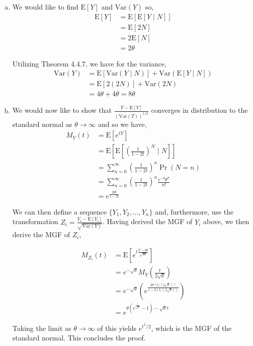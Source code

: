 \documentclass[11pt]{article}
\begin{document}
\begin{enumerate}[(a)]
  \item We would like to find $\mathrm{E}[Y]$ and $\mathrm{Var}(Y)$
    so,
    \begin{align*}
      \mathrm{E}[Y] &= \mathrm{E}[\mathrm{E}[Y \mid N]] \\
      &= \mathrm{E}[2N] \\
      &= 2 \mathrm{E}[N] \\
      &= 2 \theta
    \end{align*}

    Utilizing Theorem 4.4.7, we have for the variance,
    \begin{align*}
      \mathrm{Var}(Y) &= \mathrm{E}[\mathrm{Var}(Y \mid N)] +
                        \mathrm{Var}(\mathrm{E}[Y \mid N]) \\
      &= \mathrm{E}[2(2N)] + \mathrm{Var}(2N) \\
      &= 4 \theta + 4 \theta = 8 \theta
    \end{align*}
  \item We would now like to show that
    $\frac{Y-\mathrm{E}[Y]}{(\mathrm{Var}(T))^{1/2}}$ converges in
    distribution to the standard normal as $\theta \rightarrow \infty$
    and so we have,
    \begin{align*}
      M_Y(t) &= \mathrm{E}[e^{tY}] \\
      &= \mathrm{E}[\mathrm{E}[\left( \frac{1}{1-2t} \right)^N \mid
        N]] \\
      &= \sum_{n=0}^{\infty} \left( \frac{1}{1-2t} \right)^n
        \Pr{(N=n)} \\
      &= \sum_{n=0}^{\infty} \left( \frac{1}{1-2t} \right)^n
        \frac{e^{-\theta} \theta^{n}}{n!} \\
      &= e^{\frac{2 \theta t}{1 - 2t}}
    \end{align*}

    We can then define a sequence $\{Y_1, Y_2, \dots, Y_n\}$ and,
    furthermore, use the transformation $Z_i = \frac{Y_i -
      \mathrm{E}[Y_i]}{\sqrt{\mathrm{Var}(Y)}}$.  Having derived the
    MGF of $Y_i$ above, we then derive the MGF of $Z_i$,

    \begin{align*}
      M_{Z_i}(t) &= \mathrm{E}[e^{t \frac{Y-2 \theta}{\sqrt{4
                   \theta}}}] \\
      &= e^{-\sqrt{\theta}} M_Y\left( \frac{t}{2 \sqrt{\theta}} \right)
      \\
      &= e^{-\sqrt{\theta}} \left( e^{\frac{2 \theta
        (t/(2\sqrt{\theta}))}{1 - 2(t/(2\sqrt{\theta}))}} \right) \\
      &= e^{\theta  \left(e^{\frac{t}{\sqrt{\theta
        }}}-1\right)-\sqrt{\theta } t}
    \end{align*}

    Taking the limit as $\theta \rightarrow \infty$ of this yields
    $e^{t^2/2}$, which is the MGF of the standard normal.  This
    concludes the proof.
\end{enumerate}
\end{document}
